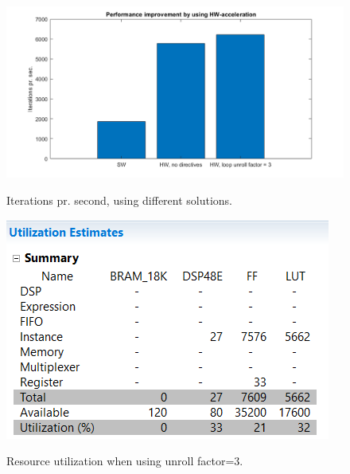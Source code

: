 \begin{figure}[H]
	\centering
	{\includegraphics[width=\textwidth]{Images/performance_improvement_iterations_per_sec.png}}\\[0.5cm]
	\caption{Iterations pr. second, using different solutions.}
	\label{fig:iterations_per_second}
\end{figure}

\begin{figure}[H]
	\centering
	{\includegraphics[width=\textwidth]{Images/resource_utilization_factor3.png}}\\[0.5cm]
	\caption{Resource utilization when using unroll factor=3.}
	\label{fig:resource_utilization}
\end{figure}